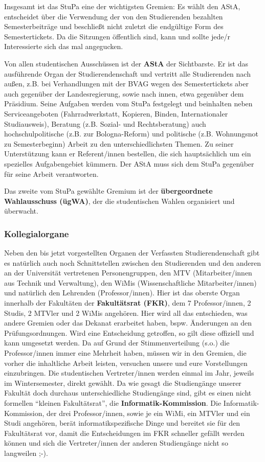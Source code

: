 Insgesamt ist das StuPa eine der wichtigsten Gremien: Es wählt den AStA, entscheidet über die Verwendung der von den Studierenden bezahlten Semesterbeiträge und beschließt nicht zuletzt die endgültige Form des Semestertickets. Da die Sitzungen öffentlich sind, kann und sollte jede/r Interessierte sich das mal angegucken.

Von allen studentischen Ausschüssen ist der \textbf{AStA} der Sichtbarste. Er ist das ausführende Organ der Studierendenschaft und vertritt alle Studierenden nach außen, z.B. bei Verhandlungen mit der BVAG wegen des Semestertickets aber auch gegenüber der Landesregierung, sowie nach innen, etwa gegenüber dem Präsidium. Seine Aufgaben werden vom StuPa festgelegt und beinhalten neben Serviceangeboten (Fahrradwerkstatt, Kopieren, Binden,
Internationaler Studiausweis), Beratung (z.B. Sozial- und Rechtsberatung) auch hochschulpolitische (z.B. zur Bologna-Reform) und politische (z.B. Wohnungsnot zu Semesterbeginn) Arbeit zu den unterschiedlichsten Themen. Zu seiner Unterstützung kann er Referent/innen bestellen, die sich hauptsächlich um ein spezielles Aufgabengebiet kümmern. Der AStA muss sich dem StuPa gegenüber für seine Arbeit verantworten.

Das zweite vom StuPa gewählte Gremium ist der \textbf{übergeordnete Wahlausschuss (ügWA)}, der die studentischen Wahlen organisiert und überwacht.

\subsubsection*{Kollegialorgane}

Neben den bis jetzt vorgestellten Organen der Verfassten Studierendenschaft gibt es natürlich auch noch Schnittstellen zwischen den Studierenden und den anderen an der Universität vertretenen Personengruppen, den MTV (Mitarbeiter/innen aus Technik und Verwaltung), den WiMis (Wissenschaftliche Mitarbeiter/innen) und natürlich den Lehrenden (Professor/innen). Hier ist das oberste Organ innerhalb der Fakultäten der \textbf{Fakultätsrat (FKR)}, dem 7 Professor/innen, 2 Studis, 2 MTVler und 2 WiMis angehören. Hier wird all das entschieden, was andere Gremien oder das Dekanat erarbeitet haben, bspw. Änderungen an den Prüfungsordnungen. Wird eine Entscheidung getroffen, so gilt diese offiziell und kann umgesetzt werden. Da auf Grund der Stimmenverteilung (s.o.) die Professor/innen immer eine Mehrheit haben, müssen wir in den Gremien, die vorher die inhaltliche Arbeit leisten, versuchen unsere und eure Vorstellungen einzubringen. Die studentischen Vertreter/innen werden einmal im Jahr, jeweils im Wintersemester, direkt gewählt. Da wie gesagt die Studiengänge unserer Fakultät doch durchaus unterschiedliche Studiengänge sind, gibt es einen nicht formellen \enquote{kleinen Fakultätsrat}, die \textbf{Informatik-Kommission}. Die Informatik-Kommission, der drei Professor/innen, sowie je ein WiMi, ein MTVler und ein Studi angehören, berät informatikspezifische Dinge und bereitet sie für den Fakultätsrat vor, damit die Entscheidungen im FKR schneller gefällt werden können und sich die Vertreter/innen der anderen Studiengänge nicht so langweilen ;-).

